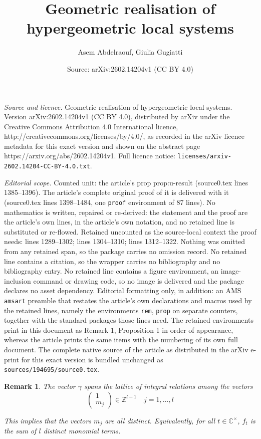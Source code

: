 \documentclass[10pt,a4paper]{amsart}
\title{Geometric realisation of hypergeometric local systems}
\author{Asem Abdelraouf, Giulia Gugiatti}
\date{Source: arXiv:2602.14204v1 (CC BY 4.0)}
\newtheorem{rem}{Remark}
\newcommand{\CC}{\mathbb{C}}
\newcommand{\ZZ}{\mathbb{Z}}
\begin{document}
\maketitle

\noindent\emph{Source and licence.} Geometric realisation of hypergeometric local systems. Version arXiv:2602.14204v1 (CC BY 4.0), distributed by arXiv under the Creative Commons Attribution 4.0 International licence, http://creativecommons.org/licenses/by/4.0/, as recorded in the arXiv licence metadata for this exact version and shown on the abstract page https://arxiv.org/abs/2602.14204v1. Full licence notice: \texttt{licenses/arxiv-2602.14204-CC-BY-4.0.txt}.\par\smallskip

\noindent\textit{Editorial scope.} Counted unit: the article's prop prop:u-result (source0.tex lines 1385--1396). The article's complete original proof of it is delivered with it (source0.tex lines 1398--1484, one \texttt{proof} environment of 87 lines). No mathematics is written, repaired or re-derived: the statement and the proof are the article's own lines, in the article's own notation, and no retained line is substituted or re-flowed.  Retained uncounted as the source-local context the proof needs: lines 1289--1302; lines 1304--1310; lines 1312--1322.  Nothing was omitted from any retained span, so the package carries no omission record.  No retained line contains a citation, so the wrapper carries no bibliography and no bibliography entry.  No retained line contains a figure environment, an image-inclusion command or drawing code, so no image is delivered and the package declares no asset dependency.  Editorial formatting only, in addition: an AMS \texttt{amsart} preamble that restates the article's own declarations and macros used by the retained lines, namely the environments \texttt{rem}, \texttt{prop} on separate counters, together with the standard packages those lines need.  The retained environments print in this document as Remark 1, Proposition 1 in order of appearance, whereas the article prints the same items with the numbering of its own full document.  The complete native source of the article as distributed in the arXiv e-print for this exact version is bundled unchanged as \texttt{sources/194695/source0.tex}.
\begin{rem}
\label{rem:gamma-relations}
The vector $\gamma$ spans the lattice of integral relations among the vectors 
    \begin{equation}
        \label{eq:KT}
    \begin{pmatrix}
1  \\
m_{j} 
\end{pmatrix} \in \ZZ^{l-1}\quad 
     j=1, \dots, l
     \end{equation}

This implies that the vectors $m_j$ are all distinct. Equivalently, for all $t\in \CC^\times$,  $f_t$ is the sum of $l$ distinct monomial terms. 
\end{rem}
\end{document}
